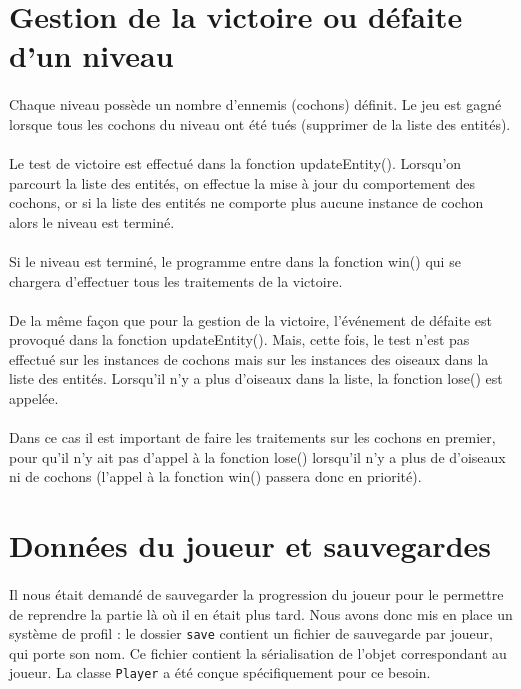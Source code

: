 \documentclass[a4paper,12pt]{report}
\begin{document}
\section{Gestion de la victoire ou défaite d'un niveau}

\paragraph{}Chaque niveau possède un nombre d’ennemis (cochons) définit. Le jeu est gagné lorsque tous les cochons du niveau ont été tués (supprimer de la liste des entités).
\paragraph{}Le test de victoire est effectué dans la fonction updateEntity(). Lorsqu'on parcourt la liste des entités, on effectue la mise à jour du comportement des cochons, or si la liste des entités ne comporte plus aucune instance de cochon alors le niveau est terminé. 
\paragraph{}Si le niveau est terminé, le programme entre dans la fonction win() qui se chargera d'effectuer tous les traitements de la victoire.
\paragraph{}De la même façon que pour la gestion de la victoire, l'événement de défaite est provoqué dans la fonction updateEntity(). Mais, cette fois, le test n'est pas effectué sur les instances de cochons mais sur les instances des oiseaux dans la liste des entités. Lorsqu'il n'y a plus d'oiseaux dans la liste, la fonction lose() est appelée.
\paragraph{}Dans ce cas il est important de faire les traitements sur les cochons en premier, pour qu'il n'y ait pas d'appel à la fonction lose() lorsqu'il n'y a plus de d'oiseaux ni de cochons (l'appel à la fonction win() passera donc en priorité).

\section{Données du joueur et sauvegardes}
\paragraph*{}
Il nous était demandé de sauvegarder la progression du joueur pour le permettre 
de reprendre la partie là où il en était plus tard. Nous avons donc mis en place 
un système de \guillemotleft profil \guillemotright : 
le dossier \verb+save+ contient un fichier de sauvegarde par joueur, qui porte son nom. 
Ce fichier contient la sérialisation de l'objet correspondant au joueur. 
La classe \verb+Player+ a été conçue spécifiquement pour ce besoin. \\
\end{document}
